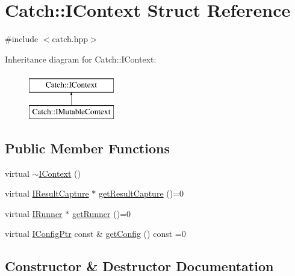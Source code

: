 \hypertarget{struct_catch_1_1_i_context}{}\section{Catch\+::I\+Context Struct Reference}
\label{struct_catch_1_1_i_context}


{\ttfamily \#include $<$catch.\+hpp$>$}

Inheritance diagram for Catch\+::I\+Context\+:\begin{figure}[H]
\begin{center}
\leavevmode
\includegraphics[height=2.000000cm]{struct_catch_1_1_i_context}
\end{center}
\end{figure}
\subsection*{Public Member Functions}
\begin{DoxyCompactItemize}
\item 
virtual \mbox{\hyperlink{struct_catch_1_1_i_context_aeb17355c1be6c2ced5407cad7202628d}{$\sim$\+I\+Context}} ()
\item 
virtual \mbox{\hyperlink{struct_catch_1_1_i_result_capture}{I\+Result\+Capture}} $\ast$ \mbox{\hyperlink{struct_catch_1_1_i_context_a684e4ae71d1fdf3060c352ecde1d122f}{get\+Result\+Capture}} ()=0
\item 
virtual \mbox{\hyperlink{struct_catch_1_1_i_runner}{I\+Runner}} $\ast$ \mbox{\hyperlink{struct_catch_1_1_i_context_af088415dde18d039ed5a2f95b02767c6}{get\+Runner}} ()=0
\item 
virtual \mbox{\hyperlink{namespace_catch_afd20a5d4f9d2f4d525db81a7765367b0}{I\+Config\+Ptr}} const  \& \mbox{\hyperlink{struct_catch_1_1_i_context_a72a2718232adea8925fec9e71d3efd75}{get\+Config}} () const =0
\end{DoxyCompactItemize}


\subsection{Constructor \& Destructor Documentation}
\mbox{\label{struct_catch_1_1_i_context_aeb17355c1be6c2ced5407cad7202628d}} 
